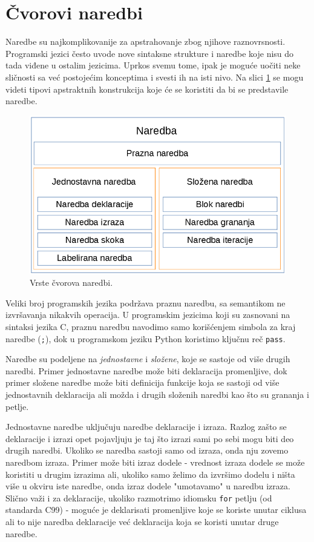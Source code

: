 \section{Čvorovi naredbi}
\label{sec:MyASTStatementNodes}

Naredbe su najkomplikovanije za apstrahovanje zbog njihove raznovrsnosti. Programski jezici često uvode nove sintaksne strukture i naredbe koje nisu do tada viđene u ostalim jezicima. Uprkos svemu tome, ipak je moguće uočiti neke sličnosti sa već postojećim konceptima i svesti ih na isti nivo. Na slici \ref{fig:StatementNodes} se mogu videti tipovi apstraktnih konstrukcija koje će se koristiti da bi se predstavile naredbe.

\begin{figure}[h!]
\centering
\includegraphics[scale=0.5]{images/statement_nodes.png}
\caption{Vrste čvorova naredbi.}
\label{fig:StatementNodes}
\end{figure}

Veliki broj programskih jezika podržava praznu naredbu, sa semantikom ne izvršavanja nikakvih operacija. U programskim jezicima koji su zasnovani na sintaksi jezika C, praznu naredbu navodimo samo korišćenjem simbola za kraj naredbe (\texttt{;}), dok u programskom jeziku Python koristimo ključnu reč \texttt{pass}. 

Naredbe su podeljene na \emph{jednostavne} i \emph{složene}, koje se sastoje od više drugih naredbi. Primer jednostavne naredbe može biti deklaracija promenljive, dok primer složene naredbe može biti definicija funkcije koja se sastoji od više jednostavnih deklaracija ali možda i drugih složenih naredbi kao što su grananja i petlje.

Jednostavne naredbe uključuju naredbe deklaracije i izraza. Razlog zašto se deklaracije i izrazi opet pojavljuju je taj što izrazi sami po sebi mogu biti deo drugih naredbi. Ukoliko se naredba sastoji samo od izraza, onda nju zovemo naredbom izraza. Primer može biti izraz dodele - vrednost izraza dodele se može koristiti u drugim izrazima ali, ukoliko samo želimo da izvršimo dodelu i ništa više u okviru iste naredbe, onda izraz dodele "umotavamo" u naredbu izraza. Slično važi i za deklaracije, ukoliko razmotrimo idiomsku \texttt{for} petlju (od standarda C99) - moguće je deklarisati promenljive koje se koriste unutar ciklusa ali to nije naredba deklaracije već deklaracija koja se koristi unutar druge naredbe. 

